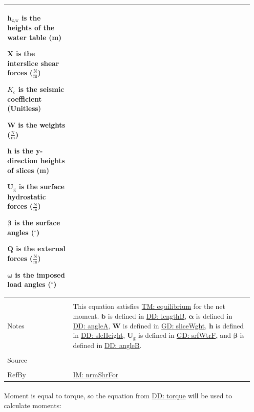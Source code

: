 \documentclass[12pt]{article}
\begin{document}
\begin{minipage}{\textwidth}
\begin{tabular}{>{\raggedright}p{}>{\raggedright\arraybackslash}p{}}
\begin{symbDescription}
              \item{${\mathbf{h}_{\text{z,w}}}$ is the heights of the water table (m)}
              \item{$\mathbf{X}$ is the interslice shear forces ($\frac{\text{N}}{\text{m}}$)}
              \item{${K_{\text{c}}}$ is the seismic coefficient (Unitless)}
              \item{$\mathbf{W}$ is the weights ($\frac{\text{N}}{\text{m}}$)}
              \item{$\mathbf{h}$ is the y-direction heights of slices (m)}
              \item{${\mathbf{U}_{\text{g}}}$ is the surface hydrostatic forces ($\frac{\text{N}}{\text{m}}$)}
              \item{$\mathbf{β}$ is the surface angles (${}^{\circ}$)}
              \item{$\mathbf{Q}$ is the external forces ($\frac{\text{N}}{\text{m}}$)}
              \item{$\mathbf{ω}$ is the imposed load angles (${}^{\circ}$)}
              \end{symbDescription}
\\ \midrule \\
Notes & This equation satisfies \hyperref[TM:equilibrium]{TM: equilibrium} for the net moment. $\mathbf{b}$ is defined in \hyperref[DD:lengthB]{DD: lengthB}, $\mathbf{α}$ is defined in \hyperref[DD:angleA]{DD: angleA}, $\mathbf{W}$ is defined in \hyperref[GD:sliceWght]{GD: sliceWght}, $\mathbf{h}$ is defined in \hyperref[DD:slcHeight]{DD: slcHeight}, ${\mathbf{U}_{\text{g}}}$ is defined in \hyperref[GD:srfWtrF]{GD: srfWtrF}, and $\mathbf{β}$ is defined in \hyperref[DD:angleB]{DD: angleB}.
        
\\ \midrule \\
Source & \cite{chen2005}
         
\\ \midrule \\
RefBy & \hyperref[IM:nrmShrFor]{IM: nrmShrFor}
        
\\ \bottomrule
\end{tabular}
\end{minipage}
\paragraph{}
\label{GD:momentEqlDeriv}
Moment is equal to torque, so the equation from \hyperref[DD:torque]{DD: torque} will be used to calculate moments:
\end{document}
